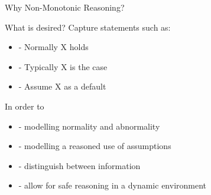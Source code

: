 \documentclass[8pt]{beamer}
\newcommand{\myfootnote}[1]{
    \renewcommand{\thefootnote}{}
    \footnotetext{\hspace{-4pt}\scriptsize#1}
    \renewcommand{\thefootnote}{\arabic{footnote}}
}
\begin{document}
\begin{comment}
\begin{block}{Naive Model}
\begin{equation*}
\begin{split}
&\forall x \; (PAINT(x,c) \to COLOUR_{n+1}(x,c)) \\
&\forall x \; (MOVE(x,p) \to POSITION_{n+1}(x,p)) \\
\end{split}
\end{equation*}
\end{block} 

\begin{block}{Inertia}
\begin{equation*}
\begin{split}
&\forall x \; ((MOVE(x,p) \wedge COLOUR_{n}(x,c)) \to COLOUR_{n+1}(x,c)) \\
&\forall x \; ((PAINT(x,p) \wedge POSITION_{n}(x,p)) \to POSITION_{n+1}(x,p)) \\
\end{split}
\end{equation*}
\end{block} 
\end{comment}


\begin{frame}{Why Non-Monotonic Reasoning?}

\begin{block}{What is desired?}
Capture statements such as:
\begin{itemize}
\item - Normally X holds
\item - Typically X is the case
\item - Assume X as a default
\end{itemize}
\end{block}


In order to 
\begin{itemize}
\item - modelling normality and abnormality
\item - modelling a reasoned use of assumptions
\item - distinguish between information
\item - allow for safe reasoning in a dynamic environment
\end{itemize}

\myfootnote{\cite{nonmonoton_stanford2018,BOCHMAN2007557}}
\end{frame}
\end{document}
